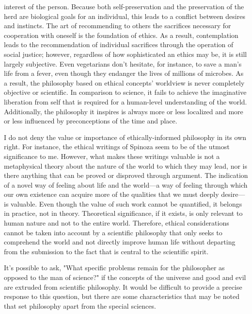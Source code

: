 \documentclass[a4paper,12pt]{book}[2004/02/16]
\theoremstyle{ilemma}
\theoremstyle{itheorem}
\theoremstyle{iother}
\theoremstyle{icorollary}
\theoremstyle{numcorollary}
\theoremstyle{idefinition}
\begin{document}
interest of the person. Because both self-preservation and the preservation of the herd are biological goals for an individual, this leads to a conflict between desires and instincts. The art of recommending to others the sacrifices necessary for cooperation with oneself is the foundation of ethics. As a result, contemplation leads to the recommendation of individual sacrifices through the operation of social justice; however, regardless of how sophisticated an ethics may be, it is still largely subjective. Even vegetarians don't hesitate, for instance, to save a man's life from a fever, even though they endanger the lives of millions of microbes. As a result, the philosophy based on ethical concepts' worldview is never completely objective or scientific. In comparison to science, it fails to achieve the imaginative liberation from self that is required for a human-level understanding of the world. Additionally, the philosophy it inspires is always more or less localized and more or less influenced by preconceptions of the time and place.

I do not deny the value or importance of ethically-informed philosophy in its own right. For instance, the ethical writings of Spinoza seem to be of the utmost significance to me. However, what makes these writings valuable is not a metaphysical theory about the nature of the world to which they may lead, nor is there anything that can be proved or disproved through argument. The indication of a novel way of feeling about life and the world—a way of feeling through which our own existence can acquire more of the qualities that we must deeply desire—is valuable. Even though the value of such work cannot be quantified, it belongs in practice, not in theory. Theoretical significance, if it exists, is only relevant to human nature and not to the entire world. Therefore, ethical considerations cannot be taken into account by a scientific philosophy that only seeks to comprehend the world and not directly improve human life without departing from the submission to the fact that is central to the scientific spirit.

It's possible to ask, "What specific problems remain for the philosopher as opposed to the man of science?" if the concepts of the universe and good and evil are extruded from scientific philosophy.
It would be difficult to provide a precise response to this question, but there are some characteristics that may be noted that set philosophy apart from the special sciences.
\end{document}

